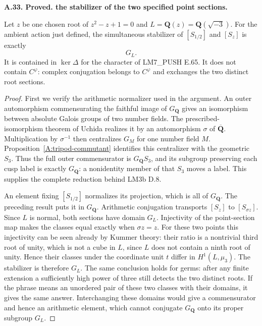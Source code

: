 \documentclass[11pt,oneside]{article}
\makeatletter
\newcounter{statementanchor}
\newenvironment{statement}[3]{%
 \refstepcounter{statementanchor}\def\@currentlabel{#1}%
 \par\addvspace{9pt}\noindent
 \textbf{#1. #2. #3.}\par\nobreak\noindent\ignorespaces
}{\par\addvspace{5pt}}
\makeatother
\begin{document}
\begin{statement}{A.33}{Proved}{the stabilizer of the two specified point sections}
\label{st:A.33}
\label{A:two-section-stabilizer}
Let $z$ be one chosen root of $z^2-z+1=0$ and
$L=\mathbf Q(z)=\mathbf Q(\sqrt{-3})$.  For the
ambient action just defined, the simultaneous stabilizer
of $[S_{1/2}]$ and $[S_z]$ is exactly
\[
                         G_L.
\]
It is contained in $\ker\Delta$ for the character
of LM7\_PUSH E.65.  It does not contain $C^\varphi$:
complex conjugation belongs to $C^\varphi$ and
exchanges the two distinct root sections.
\end{statement}
\begin{proof}
First we verify the arithmetic normalizer used in the
argument.  An outer automorphism commensurating the
faithful image of $G_{\mathbf Q}$ gives an isomorphism
between absolute Galois groups of two number fields.
The prescribed-isomorphism theorem of Uchida
\cite{A_Uchida1979} realizes it by an automorphism
$\sigma$ of $\overline{\mathbf Q}$.  Multiplication
by $\sigma^{-1}$ then centralizes $G_M$ for one
number field $M$.  Proposition~\ref{A:tripod-commutant}
identifies this centralizer with the geometric $S_3$.
Thus the full outer commensurator is
$G_{\mathbf Q}S_3$, and its subgroup preserving each
cusp label is exactly $G_{\mathbf Q}$: a nonidentity
member of that $S_3$ moves a label.  This supplies
the complete reduction behind LM3b D.8.

An element fixing $[S_{1/2}]$ normalizes its projection,
which is all of $G_{\mathbf Q}$.  The preceding result
puts it in $G_{\mathbf Q}$.  Arithmetic conjugation
transports $[S_z]$ to $[S_{\sigma z}]$.  Since $L$
is normal, both sections have domain $G_L$.
Injectivity of the point-section map makes the classes
equal exactly when $\sigma z=z$.  For these two
points this injectivity can be seen already by Kummer
theory: their ratio is a nontrivial third root of
unity, which is not a cube in $L$, since $L$ does
not contain a ninth root of unity.  Hence their
classes under the coordinate unit $t$ differ in
$H^1(L,\mu_3)$.  The stabilizer is therefore $G_L$.
The same conclusion holds for germs: after any finite
extension a sufficiently high power of three still
detects the two distinct roots.  If the phrase means
an unordered pair of these two classes with their
domains, it gives the same answer.  Interchanging
these domains would give a commensurator and hence
an arithmetic element, which cannot conjugate
$G_{\mathbf Q}$ onto its proper subgroup $G_L$.


\end{proof}
\end{document}

